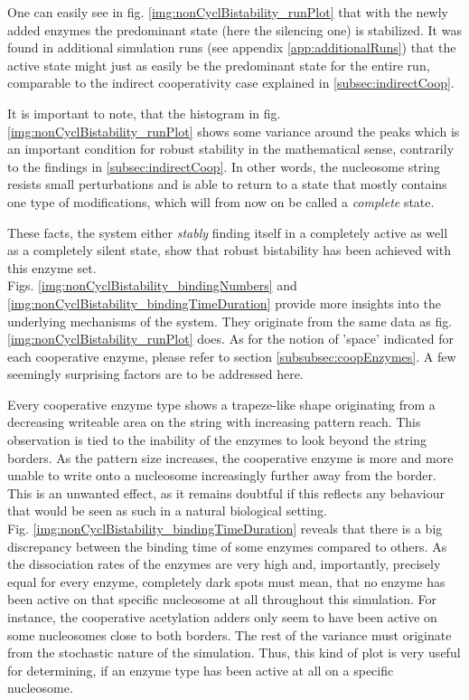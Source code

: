             One can easily see in fig. \ref{img:nonCyclBistability_runPlot} that with the newly added enzymes the predominant state (here the silencing one) is stabilized. It was found in additional simulation runs (see appendix \ref{app:additionalRuns}) that the active state might just as easily be the predominant state for the entire run, comparable to the indirect cooperativity case explained in \ref{subsec:indirectCoop}.

            It is important to note, that the histogram in fig. \ref{img:nonCyclBistability_runPlot} shows some variance around the peaks which is an important condition for robust stability in the mathematical sense, contrarily to the findings in \ref{subsec:indirectCoop}. In other words, the nucleosome string resists small perturbations and is able to return to a state that mostly contains one type of modifications, which will from now on be called a \textit{complete} state.

            These facts, the system either \textit{stably} finding itself in a completely active as well as a completely silent state, show that robust bistability has been achieved with this enzyme set.\\

            Figs. \ref{img:nonCyclBistability_bindingNumbers} and \ref{img:nonCyclBistability_bindingTimeDuration} provide more insights into the underlying mechanisms of the system. They originate from the same data as fig. \ref{img:nonCyclBistability_runPlot} does. As for the notion of 'space' indicated for each cooperative enzyme, please refer to section \ref{subsubsec:coopEnzymes}. A few seemingly surprising factors are to be addressed here.

            Every cooperative enzyme type shows a trapeze-like shape originating from a decreasing writeable area on the string with increasing pattern reach. This observation is tied to the inability of the enzymes to look beyond the string borders. As the pattern size increases, the cooperative enzyme is more and more unable to write onto a nucleosome  increasingly further away from the border. This is an unwanted effect, as it remains doubtful if this reflects any behaviour that would be seen as such in a natural biological setting.\\

            Fig. \ref{img:nonCyclBistability_bindingTimeDuration} reveals that there is a big discrepancy between the binding time of some enzymes compared to others. As the dissociation rates of the enzymes are very high and, importantly, precisely equal for every enzyme, completely dark spots must mean, that no enzyme has been active on that specific nucleosome at all throughout this simulation. For instance, the cooperative acetylation adders only seem to have been active on some nucleosomes close to both borders. The rest of the variance must originate from the stochastic nature of the simulation. Thus, this kind of plot is very useful for determining, if an enzyme type has been active at all on a specific nucleosome.\\


